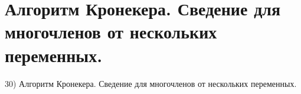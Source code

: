 \section{
 Алгоритм Кронекера. Сведение для многочленов от нескольких переменных.
}

30) Алгоритм Кронекера. Сведение для многочленов от нескольких переменных.
